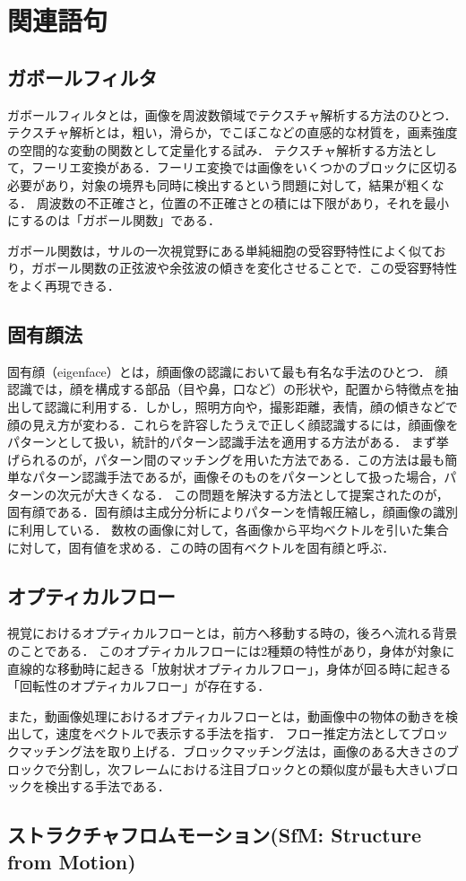 \chapter{関連語句}
\section{ガボールフィルタ}
ガボールフィルタとは，画像を周波数領域でテクスチャ解析する方法のひとつ．
テクスチャ解析とは，粗い，滑らか，でこぼこなどの直感的な材質を，画素強度の空間的な変動の関数として定量化する試み\cite{テクスチャ解析}．
テクスチャ解析する方法として，フーリエ変換がある．フーリエ変換では画像をいくつかのブロックに区切る必要があり，対象の境界も同時に検出するという問題に対して，結果が粗くなる．
周波数の不正確さと，位置の不正確さとの積には下限があり，それを最小にするのは「ガボール関数」である．\par
ガボール関数は，サルの一次視覚野にある単純細胞の受容野特性によく似ており，ガボール関数の正弦波や余弦波の傾きを変化させることで．この受容野特性をよく再現できる．
\begin{flushright}
    \cite[p.144]{認知心理学辞典}
\end{flushright}
\section{固有顔法}
固有顔（eigenface）とは，顔画像の認識において最も有名な手法のひとつ．
顔認識では，顔を構成する部品（目や鼻，口など）の形状や，配置から特徴点を抽出して認識に利用する．しかし，照明方向や，撮影距離，表情，顔の傾きなどで顔の見え方が変わる．これらを許容したうえで正しく顔認識するには，顔画像をパターンとして扱い，統計的パターン認識手法を適用する方法がある．
まず挙げられるのが，パターン間のマッチングを用いた方法である．この方法は最も簡単なパターン認識手法であるが，画像そのものをパターンとして扱った場合，パターンの次元が大きくなる．
この問題を解決する方法として提案されたのが，固有顔である．固有顔は主成分分析によりパターンを情報圧縮し，顔画像の識別に利用している．
数枚の画像に対して，各画像から平均ベクトルを引いた集合に対して，固有値を求める．この時の固有ベクトルを固有顔と呼ぶ．\par
\hfill\cite{顔画像からの個人識別}
\section{オプティカルフロー}
視覚におけるオプティカルフローとは，前方へ移動する時の，後ろへ流れる背景のことである．
このオプティカルフローには2種類の特性があり，身体が対象に直線的な移動時に起きる「放射状オプティカルフロー」，身体が回る時に起きる「回転性のオプティカルフロー」が存在する\cite[p.679]{人間の運動学}．\par
また，動画像処理におけるオプティカルフローとは，動画像中の物体の動きを検出して，速度をべクトルで表示する手法を指す．
フロー推定方法としてブロックマッチング法を取り上げる．ブロックマッチング法は，画像のある大きさのブロックで分割し，次フレームにおける注目ブロックとの類似度が最も大きいブロックを検出する手法である\cite{オプティカルフローを用いた画像中の野鳥検出}．
\section{ストラクチャフロムモーション(SfM: Structure from Motion)}
